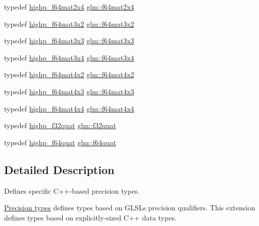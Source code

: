 \begin{DoxyCompactItemize}
\item 
typedef \hyperlink{fwd_8hpp_aa92098382f2b39d4cd111868459e0a5a}{highp\+\_\+f64mat2x4} \hyperlink{group__gtc__type__precision_gaf18b9f693f2ef743d93c9afd5cfbe229}{glm\+::f64mat2x4}
\item 
typedef \hyperlink{fwd_8hpp_a7593188af43cdd18e62f77b02d060b18}{highp\+\_\+f64mat3x2} \hyperlink{group__gtc__type__precision_ga0039ae03558b5242466f4c344c3c7d65}{glm\+::f64mat3x2}
\item 
typedef \hyperlink{fwd_8hpp_a6fec5193d73c03188d068d07801feef6}{highp\+\_\+f64mat3x3} \hyperlink{group__gtc__type__precision_gab272e67eb87cc1e8233237480c2aa8d2}{glm\+::f64mat3x3}
\item 
typedef \hyperlink{fwd_8hpp_ad2c12ef873498ae6631f18bf2a33f8eb}{highp\+\_\+f64mat3x4} \hyperlink{group__gtc__type__precision_ga36436dae85fc187d4a20d68c4d660a10}{glm\+::f64mat3x4}
\item 
typedef \hyperlink{fwd_8hpp_a44d43f20896a22ab1ce1b4e57328d361}{highp\+\_\+f64mat4x2} \hyperlink{group__gtc__type__precision_ga13dbaf75e4f1b18c35d2837067a14ce9}{glm\+::f64mat4x2}
\item 
typedef \hyperlink{fwd_8hpp_acd0f3feb3b494d0f8c5d14c810158874}{highp\+\_\+f64mat4x3} \hyperlink{group__gtc__type__precision_gab10a195a85f65da47bf70438f57a8a3c}{glm\+::f64mat4x3}
\item 
typedef \hyperlink{fwd_8hpp_a5eaa2eab37098d6d953cabeba8a57d57}{highp\+\_\+f64mat4x4} \hyperlink{group__gtc__type__precision_ga6b1ada50de2fc7d991138ab857fb2476}{glm\+::f64mat4x4}
\item 
typedef \hyperlink{fwd_8hpp_af8fed7ddfeb05fe07ba9d661644b8a47}{highp\+\_\+f32quat} \hyperlink{group__gtc__type__precision_gac59c4d798396552e4bbb866b3d8a2f18}{glm\+::f32quat}
\item 
typedef \hyperlink{fwd_8hpp_a50e023f42b7d0e2f40eff32ace71ae1a}{highp\+\_\+f64quat} \hyperlink{group__gtc__type__precision_ga5b54d7b36fbee5e271f73e6ed74e7172}{glm\+::f64quat}
\end{DoxyCompactItemize}


\subsection{Detailed Description}
Defines specific C++-\/based precision types. 

\hyperlink{group__core__precision}{Precision types} defines types based on G\+L\+SL\textquotesingle{}s precision qualifiers. This extension defines types based on explicitly-\/sized C++ data types.

